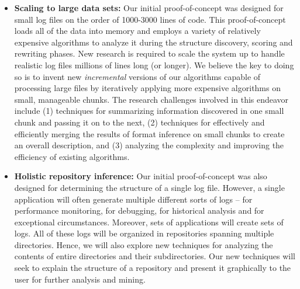 \begin{itemize}
\item {\bf Scaling to large data sets:}  Our initial proof-of-concept was 
designed for small log files on the order of 1000-3000 lines of code.
This proof-of-concept loads all of the data into memory and employs
a variety of relatively expensive algorithms to analyze it during the
structure discovery, scoring and rewriting phases.  New research is
required to scale the system up to handle realistic log files millions
of lines long (or longer).  We believe the key to doing so is to invent
new {\em incremental} versions of our algorithms capable of 
processing large files by iteratively applying more expensive
algorithms on small, manageable chunks.  The research challenges
involved in this endeavor include (1) techniques for summarizing
information discovered in one small chunk and passing it on to the
next, (2) techniques for effectively and
efficiently merging the results of format inference on small chunks
to create an overall description, and (3) analyzing the complexity and
improving the efficiency of existing algorithms.

\item {\bf Holistic repository inference:}  Our initial proof-of-concept
was also designed for determining the structure of a single log file.
However, a single application will often generate multiple different
sorts of logs -- for performance monitoring, for debugging, for 
historical analysis and for exceptional circumstances.  Moreover,
sets of applications will create sets of logs.  All of these logs
will be organized in repositories spanning multiple directories.
Hence, we will also explore new techniques for analyzing the contents
of entire directories and their subdirectories.  Our new techniques
will seek to explain the structure of a repository and present it graphically
to the user for further analysis and mining.

\end{itemize}

